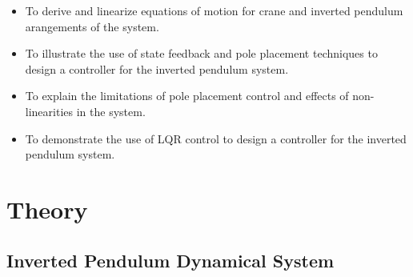 \documentclass{article}
\begin{document}
\begin{itemize}
  \item To derive and linearize equations of motion for crane and inverted pendulum arangements of the system.
  \item To illustrate the use of state feedback and pole placement techniques to design a controller for the inverted pendulum system.
  \item To explain the limitations of pole placement control and effects of non-linearities in the system.
  \item To demonstrate the use of LQR control to design a controller for the inverted pendulum system.
\end{itemize}


\section{Theory}

\subsection{Inverted Pendulum Dynamical System}
\end{document}
